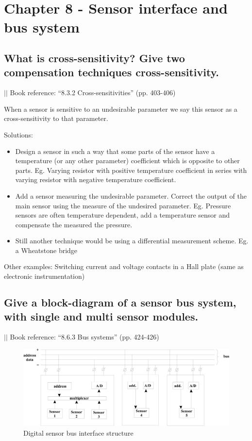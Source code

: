 \documentclass[10pt,a4paper]{article}
\author{Jonathan Dan}
\newcommand{\bookref}[2]{\indent\indent\indent\indent $\vert\vert$ Book reference: ``#1'' (pp. #2) \newline}
\begin{document}
\tableofcontents

\section{Chapter 8 - Sensor interface and bus system}

\subsection{What is cross-sensitivity? Give two compensation techniques cross-sensitivity.}

\bookref{8.3.2 Cross-sensitivities}{403-406}

When a sensor is sensitive to an undesirable parameter we say this sensor as a cross-sensitivity to that parameter.\newline

Solutions:
\begin{itemize}
	\item Design a sensor in such a way that some parts of the sensor have a temperature (or any other parameter) coefficient which is opposite to other parts. Eg. Varying resistor with positive temperature coefficient in series with varying resistor with negative temperature coefficient.
	\item Add a sensor measuring the undesirable parameter. Correct the output of the main sensor using the measure of the undesired parameter. Eg. Pressure sensors are often temperature dependent, add a temperature sensor and compensate the measured the pressure.
	\item Still another technique would be using a differential measurement scheme. Eg. a Wheatstone bridge
\end{itemize}
Other examples: Switching current and voltage contacts in a Hall plate (same as electronic instrumentation)

\subsection{Give a block-diagram of a sensor bus system, with single and multi sensor modules.}

\bookref{8.6.3 Bus systems}{424-426}

\begin{figure}[h!]
    \centering
    \includegraphics[width=\textwidth]{bus.png}
    \caption{Digital sensor bus interface structure}
\end{figure}
\end{document}
